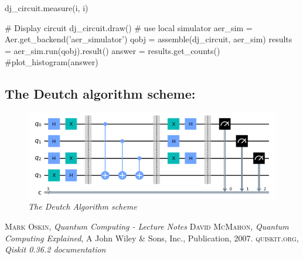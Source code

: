 \documentclass{article}
\begin{document}
{\hspace{0.5cm}
\begin{minipage}{0.3\textwidth}
dj\_circuit.measure(i, i)
 \end{minipage}
\newline
\newline
\# Display circuit
\newline
dj\_circuit.draw()
\newline
\newline
\# use local simulator
\newline
aer\_sim = Aer.get\_backend('aer\_simulator')
\newline
qobj = assemble(dj\_circuit, aer\_sim)
\newline
results = aer\_sim.run(qobj).result()
\newline
answer = results.get\_counts()
\newline
\#plot\_histogram(answer)
}
\newpage
\subsection{The Deutch algorithm scheme:}
\begin{figure}[h]
\begin{minipage}[b]{8cm}
\centering
\includegraphics[width=12cm]{deutch_schema2.png}\\\textit{The Deutch Algorithm scheme}
\end{minipage}
\end{figure}
\newpage
\begin{thebibliography}{x}
    {\scshape Mark Oskin}, {\itshape Quantum Computing - Lecture Notes}
    {\scshape David McMahon}, {\itshape Quantum Computing Explained}, A John Wiley \& Sons, Inc., Publication, 2007.
    {\scshape quiskit.org}, {\itshape Qiskit 0.36.2 documentation}
\end{thebibliography}
\end{document}
